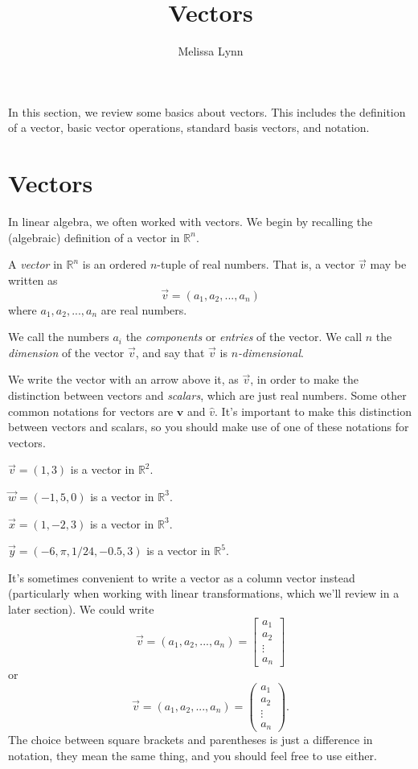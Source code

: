 \documentclass{ximera}
\title{Vectors}
\author{Melissa Lynn}
\begin{document}
  
\begin{abstract}  
\end{abstract}  
\maketitle 

In this section, we review some basics about vectors. This includes the definition of a vector, basic vector operations, standard basis vectors, and notation.

\section*{Vectors}

In linear algebra, we often worked with vectors. We begin by recalling the (algebraic) definition of a vector in $\mathbb{R}^n$.

\begin{definition}
A \emph{vector} in $\mathbb{R}^n$ is an ordered $n$-tuple of real numbers. That is, a vector $\vec{v}$ may be written as
\[
\vec{v} = (a_1,a_2,...,a_n)
\]
where $a_1,a_2,...,a_n$ are real numbers.

We call the numbers $a_i$ the \emph{components} or \emph{entries} of the vector. We call $n$ the \emph{dimension} of the vector $\vec{v}$, and say that $\vec{v}$ is \emph{$n$-dimensional}.
\end{definition}

We write the vector with an arrow above it, as $\vec{v}$, in order to make the distinction between vectors and \emph{scalars}, which are just real numbers. Some other common notations for vectors are $\mathbf{v}$ and $\hat{v}$. It's important to make this distinction between vectors and scalars, so you should make use of one of these notations for vectors.

\begin{example}
$\vec{v} = (1,3)$ is a vector in $\mathbb{R}^2$.

$\vec{w} = (-1,5,0)$ is a vector in $\mathbb{R}^3$.

$\vec{x} = (1,-2,3)$ is a vector in $\mathbb{R}^3$.

$\vec{y} = (-6,\pi, 1/24, -0.5, 3)$ is a vector in $\mathbb{R}^5$.
\end{example}

It's sometimes convenient to write a vector as a column vector instead (particularly when working with linear transformations, which we'll review in a later section). We could write
\[
\vec{v} = (a_1,a_2,...,a_n)=\left[\begin{array}{c}a_1\\a_2\\\vdots\\a_n\end{array}\right]
\]
or
\[
\vec{v} = (a_1,a_2,...,a_n)=\left(\begin{array}{c}a_1\\a_2\\\vdots\\a_n\end{array}\right).
\]
The choice between square brackets and parentheses is just a difference in notation, they mean the same thing, and you should feel free to use either.
\end{document}
